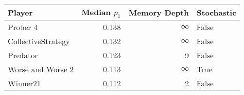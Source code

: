 \begin{tabular}{lrrl}
\toprule
             Player &  Median $p_1$ &  Memory Depth & Stochastic \\
\midrule
           Prober 4 &         0.138 &            \(\infty\) &      False \\
 CollectiveStrategy &         0.132 &            \(\infty\) &      False \\
           Predator &         0.123 &             9 &      False \\
  Worse and Worse 2 &         0.113 &            \(\infty\) &       True \\
           Winner21 &         0.112 &             2 &      False \\
\bottomrule
\end{tabular}
